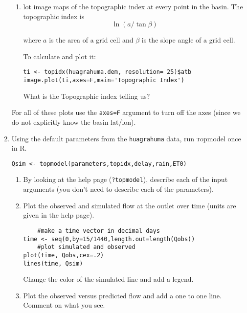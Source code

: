 \documentclass[11pt]{article}
\newcommand{\R}{\textsf{R}}
\begin{document}
\begin{enumerate}
\begin{enumerate}
\item lot image maps of the topographic index at every point in the basin.  The topographic index is 
$$\ln(a/\tan\beta)$$

where $a$ is the area of a grid cell and $\beta$ is the slope angle of a grid cell. 

To calculate and plot it:
\begin{verbatim}
ti <- topidx(huagrahuma.dem, resolution= 25)$atb
image.plot(ti,axes=F,main='Topographic Index')
\end{verbatim}

What is the Topographic index telling us?

\end{enumerate}


For all of these plots use the \texttt{axes=F} argument to turn off the axes (since we do not explicitly know the basin lat/lon). 

\item Using the default parameters from the \texttt{huagrahuma} data, run {\textsc topmodel} once in \R{}. 

\begin{verbatim}
Qsim <- topmodel(parameters,topidx,delay,rain,ET0)
\end{verbatim}

\begin{enumerate}
\item By looking at the help page (\texttt{?topmodel}), describe each of the input arguments (you don't need to describe each of the parameters). 

\item Plot the observed and simulated flow at the outlet over time (units are given in the help page). 

\begin{verbatim}
    #make a time vector in decimal days
time <- seq(0,by=15/1440,length.out=length(Qobs))
    #plot simulated and observed
plot(time, Qobs,cex=.2)
lines(time, Qsim)
\end{verbatim}

Change the color of the simulated line and add a legend. 


\item Plot the observed versus predicted flow and add a one to one line.  Comment on what you see. 


\end{enumerate}
\end{enumerate}
\end{document}
